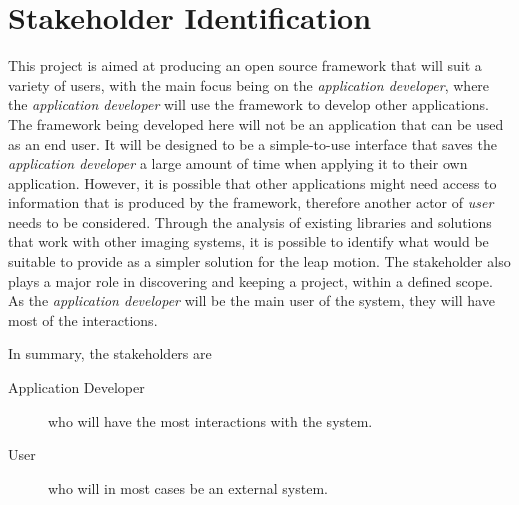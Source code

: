 \documentclass[11pt,oneside]{report}
\begin{document}
		\section{Stakeholder Identification}
			This project is aimed at producing an open source framework that will suit a variety of users, with the main focus being on the \textit{application developer}, where the \textit{application developer} will use the framework to develop other applications.
			The framework being developed here will not be an application that can be used as an end user.
			It will be designed to be a simple-to-use interface that saves the \textit{application developer} a large amount of time when applying it to their own application.
			However, it is possible that other applications might need access to information that is produced by the framework, therefore another actor of \textit{user} needs to be considered.
			Through the analysis of existing libraries and solutions that work with other imaging systems, it is possible to identify what would be suitable to provide as a simpler solution for the leap motion.
			The stakeholder also plays a major role in discovering and keeping a project, within a defined scope.
			As the \textit{application developer} will be the main user of the system, they will	have most of the interactions.
			
			In summary, the stakeholders are
			\begin{description}
			\item[Application Developer] who will have the most interactions with the system.
			\item[User] who will in most cases be an external system.
			\end{description}
		
\end{document}
